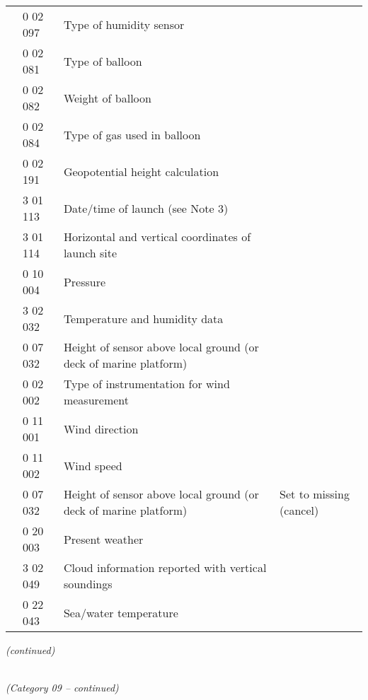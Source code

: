 \begin{longtable}[]{@{}llll@{}}
& 0 02 097 & Type of humidity sensor &\tabularnewline
& 0 02 081 & Type of balloon &\tabularnewline
& 0 02 082 & Weight of balloon &\tabularnewline
& 0 02 084 & Type of gas used in balloon &\tabularnewline
& 0 02 191 & Geopotential height calculation &\tabularnewline
& 3 01 113 & Date/time of launch (see Note 3) &\tabularnewline
& 3 01 114 & Horizontal and vertical coordinates of launch site &\tabularnewline
& 0 10 004 & Pressure &\tabularnewline
& 3 02 032 & Temperature and humidity data &\tabularnewline
& 0 07 032 & Height of sensor above local ground (or deck of marine platform) &\tabularnewline
& 0 02 002 & Type of instrumentation for wind measurement &\tabularnewline
& 0 11 001 & Wind direction &\tabularnewline
& 0 11 002 & Wind speed &\tabularnewline
& 0 07 032 & Height of sensor above local ground (or deck of marine platform) & Set to missing (cancel)\tabularnewline
& 0 20 003 & Present weather &\tabularnewline
& 3 02 049 & Cloud information reported with vertical soundings &\tabularnewline
& 0 22 043 & Sea/water temperature &\tabularnewline
\bottomrule
\end{longtable}

\emph{(continued)}

\emph{\\
(Category 09 -- continued)}

